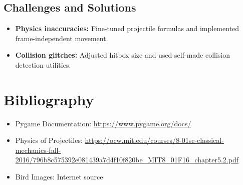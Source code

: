 \documentclass[12pt]{article}
\begin{document}
\subsection{Challenges and Solutions}
\begin{itemize}
    \item \textbf{Physics inaccuracies:} Fine-tuned projectile formulas and implemented frame-independent movement.
    \item \textbf{Collision glitches:} Adjusted hitbox size and used self-made collision detection utilities.
\end{itemize}

\section{Bibliography}
\begin{itemize}
    \item Pygame Documentation: \url{https://www.pygame.org/docs/}
    \item Physics of Projectiles: \url{https://ocw.mit.edu/courses/8-01sc-classical-mechanics-fall-2016/796b8c575392e081439a7d4f10f820be_MIT8_01F16_chapter5.2.pdf}
    \item Bird Images: Internet source
\end{itemize}
\end{document}
